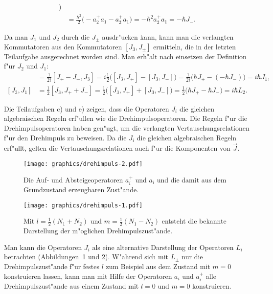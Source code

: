 \begin{loesung}
\begin{teilaufgaben}
\begin{align*}
\bigr)
\\
&=\frac{\hbar^2}{2}
\bigl(
-a_2^+a_1 - a_2^+a_1
\bigr)
=-\hbar^2 a_2^+a_1=-\hbar J_-.
\end{align*}
\item 
Da man $J_1$ und $J_2$ durch die $J_\pm$ ausdr"ucken kann, kann man
die verlangten Kommutatoren aus den
Kommutatoren $[J_3,J_\pm]$ ermitteln, die in der letzten Teilaufgabe
ausgerechnet worden sind.
Man erh"alt nach einsetzen der Definition f"ur $J_2$ und $J_1$:
\begin{align*}
[J_2,J_3]
&=
\frac1{2i}[J_+-J_-,J_3]
=
i\frac{1}{2}\bigl([J_3,J_+] - [J_3,J_-]\bigr)
=
\frac1{2i}\bigl(\hbar J_+-(-\hbar J_-)\bigr)
=i\hbar J_1,
\\
[J_3,J_1]
&=
\frac{1}{2}[J_3,J_++J_-]
=
\frac{1}{2}\bigl(
[J_3,J_+]
+
[J_3,J_-]
\bigr)
=\frac12\bigl(
\hbar J_+
-
\hbar J_-
\bigr)
=i\hbar L_2.
\end{align*}
\item Die Teilaufgaben c) und e) zeigen, dass die Operatoren $J_i$
die gleichen algebraischen Regeln erf"ullen wie die Drehimpulsoperatoren.
Die Regeln f"ur die Drehimpulsoperatoren haben gen"ugt, um die verlangten
Vertauschungsrelationen f"ur den Drehimpuls zu beweisen. Da die $J_i$
die gleichen algebraischen Regeln erf"ullt, gelten die Vertauschungsrelationen
auch f"ur die Komponenten von $\vec J$.
\end{teilaufgaben}
\end{loesung}

\begin{diskussion}
\begin{figure}
\centering
\texttt{[image: graphics/drehimpuls-2.pdf]}
\caption{Die Auf- und Absteigeoperatoren $a_i^+$ und $a_i$ und die
damit aus dem Grundzustand erzeugbaren Zust"ande.
\label{aufgabe12001:operatoren}}
\end{figure}
\begin{figure}
\centering
\texttt{[image: graphics/drehimpuls-1.pdf]}
\caption{Mit $l=\frac12(N_1+N_2)$ und $m=\frac12(N_1-N_2)$ entsteht
die bekannte Darstellung der m"oglichen Drehimpulszust"ande.
\label{aufgabe12001:drehimpuls}}
\end{figure}
Man kann die Operatoren $J_i$ als eine alternative Darstellung der Operatoren
$L_i$ betrachten (Abbildungen~\ref{aufgabe12001:operatoren} und \ref{aufgabe12001:drehimpuls}).
W"ahrend sich mit $L_\pm$ nur die Drehimpulszust"ande f"ur festes
$l$ zum Beispiel aus dem Zustand mit $m=0$ konstruieren lassen,
kann man mit Hilfe der Operatoren $a_i$ und $a_i^+$ alle Drehimpulszust"ande
aus einem Zustand mit $l=0$ und $m=0$ konstruieren.
\end{diskussion}

